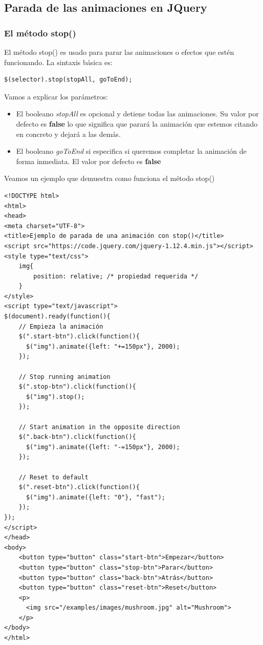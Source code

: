 \documentclass[11pt]{article}
\begin{document}
\subsection*{Parada de las animaciones en JQuery}
\label{sec:org179b393}

\subsubsection*{El método stop()}
\label{sec:orgfdc52c0}

El método stop() es usado para parar las animaciones o efectos que estén funcionando. La sintaxis básica es:

\begin{verbatim}
$(selector).stop(stopAll, goToEnd);
\end{verbatim}

Vamos a explicar los parámetros:

\begin{itemize}
\item El booleano \emph{stopAll} es opcional y detiene todas las animaciones. Su valor por defecto es \textbf{false} lo que significa que parará la animación que estemos citando en concreto y dejará a las demás.
\item El booleano \emph{goToEnd} si especifica si queremos completar la animación de forma inmediata. El valor por defecto es \textbf{false}
\end{itemize}

Veamos un ejemplo que demuestra como funciona el método stop() 

\begin{verbatim}
<!DOCTYPE html>
<html>
<head>
<meta charset="UTF-8">
<title>Ejemplo de parada de una animación con stop()</title>
<script src="https://code.jquery.com/jquery-1.12.4.min.js"></script>
<style type="text/css">
    img{
        position: relative; /* propiedad requerida */
    }
</style>
<script type="text/javascript">
$(document).ready(function(){
    // Empieza la animación
    $(".start-btn").click(function(){
      $("img").animate({left: "+=150px"}, 2000);
    });

    // Stop running animation
    $(".stop-btn").click(function(){
      $("img").stop();
    });

    // Start animation in the opposite direction
    $(".back-btn").click(function(){
      $("img").animate({left: "-=150px"}, 2000);
    });

    // Reset to default
    $(".reset-btn").click(function(){
      $("img").animate({left: "0"}, "fast");
    });
});
</script>
</head>
<body>
    <button type="button" class="start-btn">Empezar</button>
    <button type="button" class="stop-btn">Parar</button>
    <button type="button" class="back-btn">Atrás</button>
    <button type="button" class="reset-btn">Reset</button>
    <p>
      <img src="/examples/images/mushroom.jpg" alt="Mushroom">
    </p>
</body>
</html>                                		                                		
\end{verbatim}
\end{document}

